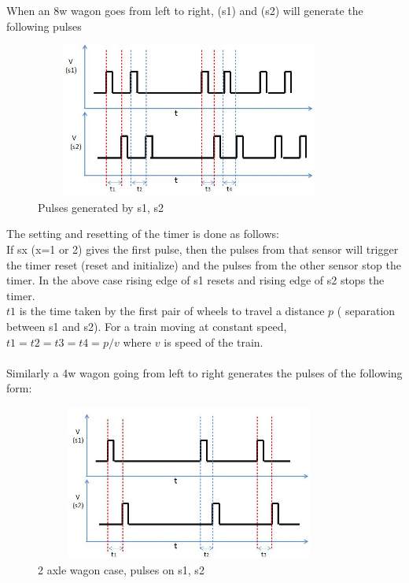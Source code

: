 \documentclass[aps,letterpaper,11pt]{article}
\begin{document}
When an 8w wagon goes from left to right, (s1) and (s2) will generate the
 following pulses
\begin{figure}[H]
\begin{center}
\includegraphics[height = 2in,width=4in,angle=00]{figures/w8_no_missing.JPG}
\caption{\small Pulses generated by s1, s2}
\end{center}
\end{figure}

The setting and resetting of the timer is done as follows: \\
If sx (x=1 or 2) gives the first pulse, then the pulses from that sensor will
trigger the timer reset (reset and initialize) and the pulses from the other
sensor stop the timer. In the above case rising edge of s1 resets and rising
edge of s2 stops the timer. \\
$t1$ is the time taken by the first pair of wheels to travel a distance $p$ (
separation between s1 and s2). For a train moving at constant speed, $t1 = t2
= t3 = t4 = p/v$ where $v$ is speed of the train. \\ \\
Similarly a 4w wagon going from left to right generates the pulses of the
following form:
\begin{figure}[H]
\begin{center}
\includegraphics[height = 2in,width=4in,angle=00]{figures/w4_no_missing.JPG}
\caption{\small 2 axle wagon case, pulses on s1, s2}
\end{center}
\end{figure}
\end{document}
